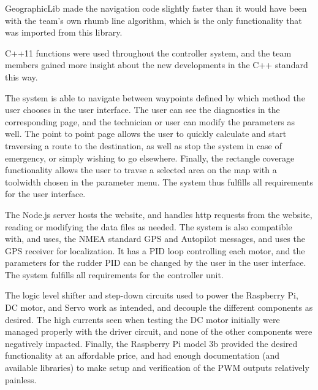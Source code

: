 GeographicLib made the navigation code slightly faster than it would have been with the team's own rhumb line algorithm, which is the only functionality that was imported from this library. 

C++11 functions were used throughout the controller system, and the team members gained more insight about the new developments in the C++ standard this way.

The system is able to navigate between waypoints defined by which method the user chooses in the user interface. The user can see the diagnostics in the corresponding page, and the technician or user can modify the parameters as well. The point to point page allows the user to quickly calculate and start traversing a route to the destination, as well as stop the system in case of emergency, or simply wishing to go elsewhere. Finally, the rectangle coverage functionality allows the user to travse a selected area on the map with a toolwidth chosen in the parameter menu. The system thus fulfills all requirements for the user interface. 

The Node.js server hosts the website, and handles http requests from the website, reading or modifying the data files as needed. %
The system is also compatible with, and uses, the NMEA standard GPS and Autopilot messages, and uses the GPS receiver for localization. It has a PID loop controlling each motor, and the parameters for the rudder PID can be changed by the user in the user interface. The system fulfills all requirements for the controller unit. 

The logic level shifter and step-down circuits used to power the Raspberry Pi, DC motor, and Servo work as intended, and decouple the different components as desired. The high currents seen when testing the DC motor initially were managed properly with the driver circuit, and none of the other components were negatively impacted. Finally, the Raspberry Pi model 3b provided the desired functionality at an affordable price, and had enough documentation (and available libraries) to make setup and verification of the PWM outputs relatively painless. 